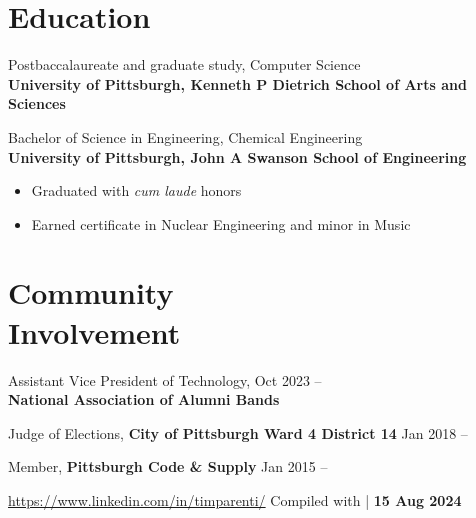 \documentclass[11pt]{article}
\newcommand{\lmr}{\fontfamily{lmr}\selectfont} %
\newcommand{\textdb}[1]{\fontseries{db}\selectfont#1\normalfont}
\newcommand{\present}{\phantom{Xxx 20XX}}
\begin{document}
\section{Education}

\textdb{
Postbaccalaureate and graduate study, Computer Science
	\\
}
\textbf{University of Pittsburgh, Kenneth P Dietrich School of Arts and Sciences}

\textdb{
Bachelor of Science in Engineering, Chemical Engineering
	\\
}
\textbf{University of Pittsburgh, John A Swanson School of Engineering}
\begin{itemize}
	\item Graduated with \emph{cum laude} honors
	\item Earned certificate in Nuclear Engineering and minor in Music
\end{itemize}



\section{Community\\ Involvement}

\textdb{
Assistant Vice President of Technology,
	\hfill Oct 2023 -- \present \\
}
\textbf{National Association of Alumni Bands}

\textdb{
Judge of Elections,
\textbf{City of Pittsburgh Ward 4 District 14}
	\hfill Jan 2018 -- \present
}

\textdb{
Member,
\textbf{Pittsburgh Code \& Supply}
	\hfill Jan 2015 -- \present
}



\begin{adjustwidth}{-1in}{0pt}
	\hrulefill \par
	\hypersetup{linkcolor=gray}
	\small
	\url{https://www.linkedin.com/in/timparenti/} \hfill {\lmr Compiled with \XeLaTeX} | \textbf{15 Aug 2024}
\end{adjustwidth}
\end{document}
